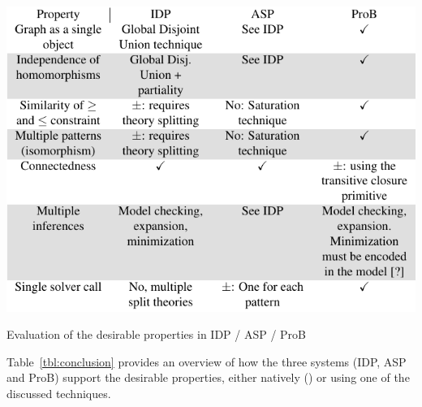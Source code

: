 \begin{table}[h]
\begin{center}
\includegraphics[scale=0.75]{PropertyTable-crop.pdf}
\end{center}
\caption{Evaluation of the desirable properties in IDP / ASP / ProB\label{tbl:conclusion}}
\end{table}

Table~\ref{tbl:conclusion} provides an overview of how the three systems (IDP, ASP and ProB) support the desirable properties, either natively (\checkmark) or using one of the discussed techniques.

